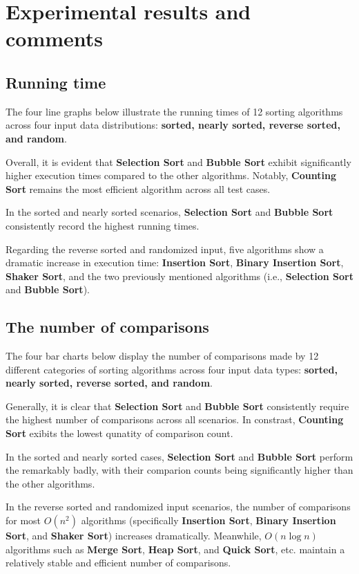 \section{Experimental results and comments}
    \subsection{Running time}
        The four line graphs below illustrate the running times of 12 
        sorting algorithms across four input data distributions: 
        \textbf{sorted, nearly sorted, reverse sorted, and random}.

        \indent Overall, it is evident that \textbf{Selection Sort} and \textbf{Bubble Sort}
        exhibit significantly higher execution times compared to 
        the other algorithms. Notably, \textbf{Counting Sort} remains the 
        most efficient algorithm across all test cases.

        \indent In the sorted and nearly sorted scenarios, \textbf{Selection Sort} 
        and \textbf{Bubble Sort} consistently record the highest running times.
        
        \indent Regarding the reverse sorted and randomized input, five algorithms show a 
        dramatic increase in execution time: \textbf{Insertion Sort}, \textbf{Binary Insertion Sort}, 
        \textbf{Shaker Sort}, and the two previously mentioned algorithms (i.e., \textbf{Selection Sort} and \textbf{Bubble Sort}).
    \subsection{The number of comparisons}
        The four bar charts below display the number of comparisons made by
        12 different categories of sorting algorithms across four input data types:
        \textbf{sorted, nearly sorted, reverse sorted, and random}.

        \indent Generally, it is clear that \textbf{Selection Sort} and \textbf{Bubble Sort} consistently
        require the highest number of comparisons across all scenarios.
        In constrast, \textbf{Counting Sort} exibits the lowest qunatity of comparison count.

        \indent In the sorted and nearly sorted cases, \textbf{Selection Sort} and \textbf{Bubble Sort}
        perform the remarkably badly, with their comparion counts being significantly
        higher than the other algorithms. 

        \indent In the reverse sorted and randomized input scenarios,
        the number of comparisons for most $O(n^2)$ algorithms (specifically \textbf{Insertion Sort},
        \textbf{Binary Insertion Sort}, and \textbf{Shaker Sort}) increases dramatically.
        Meanwhile, $O(n \log n)$ algorithms such as \textbf{Merge Sort}, \textbf{Heap Sort}, and \textbf{Quick Sort}, etc.
        maintain a relatively stable and efficient number of comparisons.
